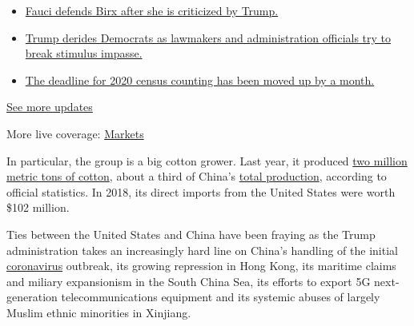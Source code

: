 \begin{itemize}
\tightlist
\item
  \href{https://www.nytimes3xbfgragh.onion/2020/08/03/world/coronavirus-covid-19.html?action=click\&pgtype=Article\&state=default\&region=MAIN_CONTENT_1\&context=storylines_live_updates\#link-4547638f}{Fauci
  defends Birx after she is criticized by Trump.}
\item
  \href{https://www.nytimes3xbfgragh.onion/2020/08/03/world/coronavirus-covid-19.html?action=click\&pgtype=Article\&state=default\&region=MAIN_CONTENT_1\&context=storylines_live_updates\#link-15e7f995}{Trump
  derides Democrats as lawmakers and administration officials try to
  break stimulus impasse.}
\item
  \href{https://www.nytimes3xbfgragh.onion/2020/08/03/world/coronavirus-covid-19.html?action=click\&pgtype=Article\&state=default\&region=MAIN_CONTENT_1\&context=storylines_live_updates\#link-e5a2cda}{The
  deadline for 2020 census counting has been moved up by a month.}
\end{itemize}

\href{https://www.nytimes3xbfgragh.onion/2020/08/03/world/coronavirus-covid-19.html?action=click\&pgtype=Article\&state=default\&region=MAIN_CONTENT_1\&context=storylines_live_updates}{See
more updates}

More live coverage:
\href{https://www.nytimes3xbfgragh.onion/live/2020/08/03/business/stock-market-today-coronavirus?action=click\&pgtype=Article\&state=default\&region=MAIN_CONTENT_1\&context=storylines_live_updates}{Markets}

In particular, the group is a big cotton grower. Last year, it produced
\href{http://www.xjbt.gov.cn/c/2020-04-26/7346731.shtml?ad_check=1}{two
million metric tons of cotton}, about a third of China's
\href{http://www.stats.gov.cn/tjsj/zxfb/201912/t20191217_1718007.html}{total
production}, according to official statistics. In 2018, its direct
imports from the United States were worth \$102 million.

Ties between the United States and China have been fraying as the Trump
administration takes an increasingly hard line on China's handling of
the initial
\href{https://www.nytimes3xbfgragh.onion/news-event/coronavirus}{coronavirus}
outbreak, its growing repression in Hong Kong, its maritime claims and
miliary expansionism in the South China Sea, its efforts to export 5G
next-generation telecommunications equipment and its systemic abuses of
largely Muslim ethnic minorities in Xinjiang.

